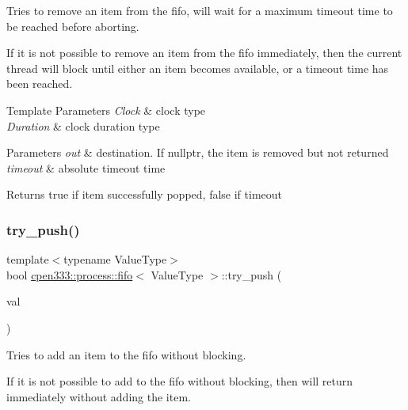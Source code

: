 Tries to remove an item from the fifo, will wait for a maximum timeout time to be reached before aborting. 

If it is not possible to remove an item from the fifo immediately, then the current thread will block until either an item becomes available, or a timeout time has been reached.


\begin{DoxyTemplParams}{Template Parameters}
{\em Clock} & clock type \\
\hline
{\em Duration} & clock duration type \\
\hline
\end{DoxyTemplParams}

\begin{DoxyParams}{Parameters}
{\em out} & destination. If {\ttfamily nullptr}, the item is removed but not returned \\
\hline
{\em timeout} & absolute timeout time \\
\hline
\end{DoxyParams}
\begin{DoxyReturn}{Returns}
{\ttfamily true} if item successfully popped, {\ttfamily false} if timeout 
\end{DoxyReturn}
\mbox{\label{classcpen333_1_1process_1_1fifo_ad6a7fb652df17c022023fcc805ba61eb}} 
\subsubsection{\texorpdfstring{try\+\_\+push()}{try\_push()}}
{\footnotesize\ttfamily template$<$typename Value\+Type$>$ \\
bool \hyperlink{classcpen333_1_1process_1_1fifo}{cpen333\+::process\+::fifo}$<$ Value\+Type $>$\+::try\+\_\+push (\begin{DoxyParamCaption}\item[{const Value\+Type \&}]{val }\end{DoxyParamCaption})\hspace{0.3cm}{\ttfamily [inline]}}



Tries to add an item to the fifo without blocking. 

If it is not possible to add to the fifo without blocking, then will return immediately without adding the item.


